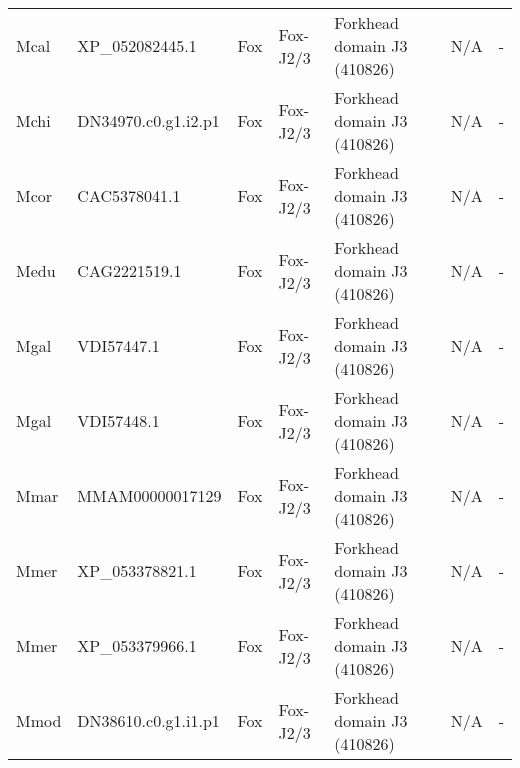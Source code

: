 \documentclass[../main.tex]{subfiles}
\begin{document}
\begin{landscape}
\begin{longtable}{lllllll}
		Mcal           & XP\_052082445.1       & Fox            & Fox-J2/3            & Forkhead domain J3 (410826)                 & N/A                                                                    & -                    \\
		Mchi           & DN34970.c0.g1.i2.p1   & Fox            & Fox-J2/3            & Forkhead domain J3 (410826)                 & N/A                                                                    & -                    \\
		Mcor           & CAC5378041.1          & Fox            & Fox-J2/3            & Forkhead domain J3 (410826)                 & N/A                                                                    & -                    \\
		Medu           & CAG2221519.1          & Fox            & Fox-J2/3            & Forkhead domain J3 (410826)                 & N/A                                                                    & -                    \\
		Mgal           & VDI57447.1            & Fox            & Fox-J2/3            & Forkhead domain J3 (410826)                 & N/A                                                                    & -                    \\
		Mgal           & VDI57448.1            & Fox            & Fox-J2/3            & Forkhead domain J3 (410826)                 & N/A                                                                    & -                    \\
		Mmar           & MMAM00000017129       & Fox            & Fox-J2/3            & Forkhead domain J3 (410826)                 & N/A                                                                    & -                    \\
		Mmer           & XP\_053378821.1       & Fox            & Fox-J2/3            & Forkhead domain J3 (410826)                 & N/A                                                                    & -                    \\
		Mmer           & XP\_053379966.1       & Fox            & Fox-J2/3            & Forkhead domain J3 (410826)                 & N/A                                                                    & -                    \\
		Mmod           & DN38610.c0.g1.i1.p1   & Fox            & Fox-J2/3            & Forkhead domain J3 (410826)                 & N/A                                                                    & -                    \\

\end{longtable}
\end{landscape}
\end{document}
